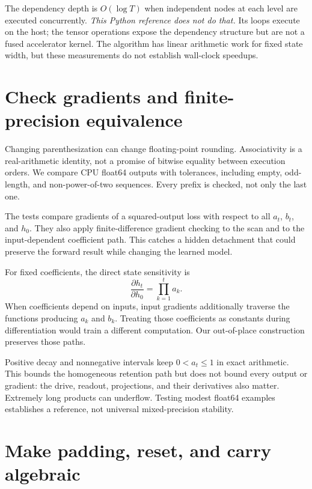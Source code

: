 The dependency depth is $O(\log T)$ when independent nodes at each level
are executed concurrently. \emph{This Python reference does not do that.}
Its loops execute on the host; the tensor operations expose the dependency
structure but are not a fused accelerator kernel. The algorithm has
linear arithmetic work for fixed state width, but these measurements
do not establish wall-clock speedups.

\section{Check gradients and finite-precision equivalence}

Changing parenthesization can change floating-point rounding.
Associativity is a real-arithmetic identity, not a promise of bitwise
equality between execution orders. We compare CPU float64 outputs with
tolerances, including empty, odd-length, and non-power-of-two sequences.
Every prefix is checked, not only the last one.

The tests compare gradients of a squared-output loss with respect to
all $a_t$, $b_t$, and $h_0$. They also apply finite-difference gradient
checking to the scan and to the input-dependent coefficient path.
This catches a hidden detachment that could preserve the forward result
while changing the learned model.

For fixed coefficients, the direct state sensitivity is
\begin{equation}
 \frac{\partial h_t}{\partial h_0}=\prod_{k=1}^t a_k.
\end{equation}
When coefficients depend on inputs, input gradients additionally traverse
the functions producing $a_k$ and $b_k$. Treating those coefficients as
constants during differentiation would train a different computation.
Our out-of-place construction preserves those paths.

Positive decay and nonnegative intervals keep $0<a_t\leq1$ in exact
arithmetic. This bounds the homogeneous retention path but does not
bound every output or gradient: the drive, readout, projections, and
their derivatives also matter. Extremely long products can underflow.
Testing modest float64 examples establishes a reference, not universal
mixed-precision stability.

\section{Make padding, reset, and carry algebraic}

